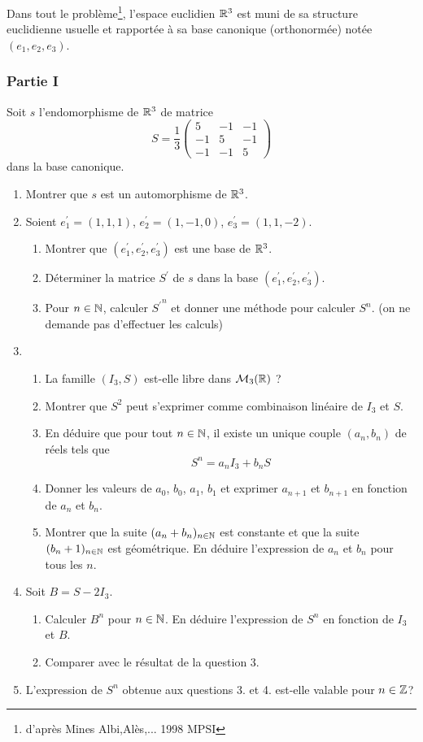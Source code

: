 Dans tout le problème\footnote{d'après Mines Albi,Alès,... 1998 MPSI}, l'espace euclidien $\mathbb{R}^3$ est muni de sa structure euclidienne usuelle et rapportée à sa base canonique (orthonormée) notée $(e_1,e_2,e_3)$.
\subsubsection*{Partie I}
Soit $s$ l'endomorphisme de $\mathbb{R}^3$ de matrice
\begin{displaymath}
S = \frac{1}{3}\left( \begin{array}{ccc}
5 & -1 & -1 \\ 
-1 & 5 & -1 \\ 
-1 & -1 & 5
    \end{array}\right) 
\end{displaymath}
dans la base canonique.
\begin{enumerate}
 \item Montrer que $s$ est un automorphisme de $\mathbb{R}^3$.
\item Soient $e^\prime _1=(1,1,1)$, $e^\prime _2=(1,-1,0)$, $e^\prime _3=(1,1,-2)$.
\begin{enumerate}
 \item Montrer que $(e^\prime _1, e^\prime _2, e^\prime _3)$ est une base de $\mathbb{R}^3$.
\item Déterminer la matrice $S^\prime$ de $s$ dans la base $(e^\prime _1, e^\prime _2, e^\prime _3)$.
\item Pour $n\in \mathbb{N}$, calculer ${S^{\prime}}^n$ et donner une méthode pour calculer $S^n$. (on ne demande pas d'effectuer les calculs)
\end{enumerate}
\item \begin{enumerate}
 \item La famille $(I_3,S)$ est-elle libre dans $\mathcal{M}_3(\mathbb{R})$ ?
\item Montrer que $S^2$ peut s'exprimer comme combinaison linéaire de $I_3$ et $S$.
\item En déduire que pour tout $n\in \mathbb{N}$, il existe un unique couple $(a_n,b_n)$ de réels tels que
\[S^n=a_nI_3+b_nS\]
\item Donner les valeurs de $a_0$, $b_0$, $a_1$, $b_1$ et exprimer $a_{n+1}$ et $b_{n+1}$ en fonction de $a_n$ et $b_n$.
\item Montrer que la suite $(a_n+b_n)_{n\in \mathbb{N}}$ est constante et que la suite $(b_n+1)_{n\in \mathbb{N}}$ est géométrique. En déduire l'expression de $a_n$ et $b_n$ pour tous les $n$.
\end{enumerate}
\item Soit $B=S-2I_3$.
\begin{enumerate}
 \item Calculer $B^n$ pour $n\in \mathbb{N}$. En déduire l'expression de $S^n$ en fonction de $I_3$ et $B$.
\item Comparer avec le résultat de la question 3.
\end{enumerate}
\item L'expression de $S^n$ obtenue aux questions 3. et 4. est-elle valable pour $n\in \mathbb{Z}$?
\end{enumerate}
